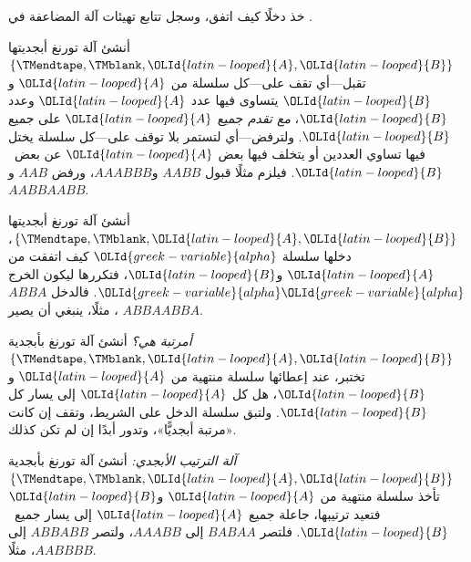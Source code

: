 \documentclass[../../../include/open-logic-section]{subfiles}
\begin{document}
\begin{prob}
خذ دخلًا كيف اتفق، وسجل تتابع تهيئات آلة المضاعفة في .
\end{prob}

\begin{prob}
أنشئ آلة تورنغ أبجديتها $\{\TMendtape,\TMblank,\OLId{latin-looped}{A},\OLId{latin-looped}{B}\}$ تقبل---أي تقف على---كل سلسلة من $\OLId{latin-looped}{A}$ و$\OLId{latin-looped}{B}$ يتساوى فيها عدد $\OLId{latin-looped}{A}$ وعدد $\OLId{latin-looped}{B}$، \emph{مع تقدم} جميع $\OLId{latin-looped}{A}$ على جميع $\OLId{latin-looped}{B}$. ولترفض---أي لتستمر بلا توقف على---كل سلسلة يختل فيها تساوي العددين أو يتخلف فيها بعض $\OLId{latin-looped}{A}$ عن بعض~$\OLId{latin-looped}{B}$. فيلزم مثلًا قبول $AABB$ و$AAABBB$، ورفض $AAB$ و$AABBAABB$.
\end{prob}

\begin{prob}
أنشئ آلة تورنغ أبجديتها $\{\TMendtape,\TMblank,\OLId{latin-looped}{A},\OLId{latin-looped}{B}\}$، دخلها سلسلة $\OLId{greek-variable}{alpha}$ كيف اتفقت من $\OLId{latin-looped}{A}$ و$\OLId{latin-looped}{B}$، فتكررها ليكون الخرج $\OLId{greek-variable}{alpha}\OLId{greek-variable}{alpha}$. فالدخل $ABBA$، مثلًا، ينبغي أن يصير $ABBAABBA$.
\end{prob}

\begin{prob}
\emph{أمرتبة هي؟} أنشئ آلة تورنغ بأبجدية $\{\TMendtape,\TMblank,\OLId{latin-looped}{A},\OLId{latin-looped}{B}\}$ تختبر، عند إعطائها سلسلة منتهية من $\OLId{latin-looped}{A}$ و$\OLId{latin-looped}{B}$، هل كل $\OLId{latin-looped}{A}$ إلى يسار كل $\OLId{latin-looped}{B}$. ولتبق سلسلة الدخل على الشريط، وتقف إن كانت «مرتبة أبجديًّا»، وتدور أبدًا إن لم تكن كذلك.
\end{prob}

\begin{prob}
\emph{آلة الترتيب الأبجدي:} أنشئ آلة تورنغ بأبجدية $\{\TMendtape,\TMblank,\OLId{latin-looped}{A},\OLId{latin-looped}{B}\}$ تأخذ سلسلة منتهية من $\OLId{latin-looped}{A}$ و$\OLId{latin-looped}{B}$ فتعيد ترتيبها، جاعلة جميع $\OLId{latin-looped}{A}$ إلى يسار جميع~$\OLId{latin-looped}{B}$. فلتصر $BABAA$ إلى $AAABB$، ولتصر $ABBABB$ إلى $AABBBB$، مثلًا.
\end{prob}
\end{document}
